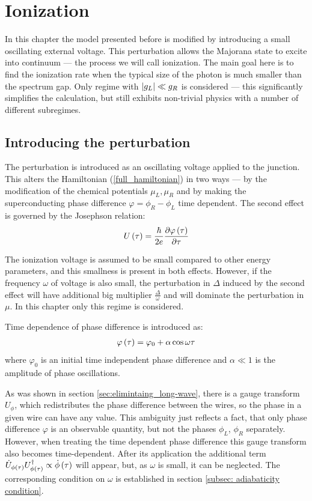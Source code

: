 \chapter{Ionization}
\label{chap:ionization}

In this chapter the model presented before is modified by introducing a small oscillating  external voltage. This perturbation allows the Majorana state to excite into continuum --- the process we will call ionization. The main goal here is to find the ionization rate when the typical size of the photon is much smaller than the spectrum gap.  Only regime with $ \left|g_L\right|\ll g_R $ is considered --- this significantly simplifies the calculation, but still exhibits non-trivial physics with a number of different subregimes. 

\section{Introducing the perturbation}

 The perturbation is introduced as an oscillating	 voltage applied to the junction. This alters the Hamiltonian (\ref{full_hamiltonian}) in two ways --- by the modification of the chemical potentials $ \mu_L, \mu_R $ and by making the superconducting phase difference $ \varphi=\phi_R-\phi_L $ time dependent. The second effect is governed by the Josephson relation:
\begin{gather}
	U\left(\tau\right)
	=
	\frac{\hbar}{2e}
	\frac{\partial\varphi\left(\tau\right)}{\partial \tau}
\end{gather}

The ionization voltage is assumed to be small compared to other energy parameters, and this smallness is present in both effects. However, if the frequency $ \omega $ of voltage is also small, the perturbation in $ \Delta $ induced by the second effect will have additional big multiplier $ \frac{\Delta}{\omega} $ and will dominate the perturbation in $ \mu $. In this chapter only this regime is considered.

Time dependence of phase difference is introduced as:
\begin{gather}
	\varphi\left(\tau\right)=\varphi_0+\alpha\cos\omega \tau
\end{gather}
where $ \varphi_0 $ is an initial time independent phase difference and $ \alpha\ll1 $ is the amplitude of phase oscillations.

As was shown in section  \ref{sec:elimintaing_long-wave}, there is a gauge transform $ U_\phi $, which  redistributes the phase difference between the wires, so the phase in a given wire can have any value. This ambiguity just reflects a  fact, that only phase difference $ \varphi $ is an observable quantity, but not the phases $ \phi_L $, $ \phi_R $ separately. However, when treating the time dependent  phase difference this gauge transform also becomes time-dependent. After its application the additional term $ \dot{U}_{\phi\left(\tau\right)}U_{\phi\left(\tau\right)}^\dagger \propto \dot{\phi}\left(\tau\right)$ will appear, but, as $ \omega $ is small, it can be neglected. The corresponding condition on $ \omega $ is established in section \ref{subsec: adiabaticity condition}. 

